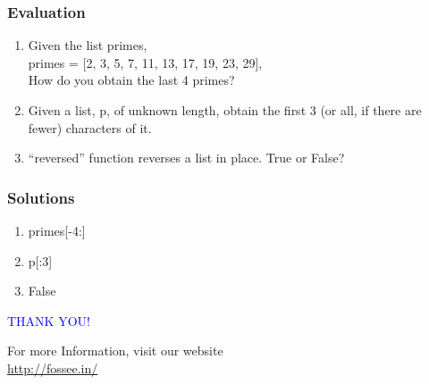 \documentclass[presentation]{beamer}
\begin{document}
\begin{frame}
\frametitle{Evaluation}
\label{sec-10}


\begin{enumerate}
\item Given the list primes,\\ primes = [2, 3, 5, 7, 11, 13, 17, 19, 23,
   29],\\ How do you obtain the last 4 primes?
\vspace{11pt}   
\item Given a list, p, of unknown length, obtain the first 3 (or all, if
   there are fewer) characters of it.
\vspace{11pt}   
\item ``reversed'' function reverses a list in place. True or False?
\end{enumerate}
\end{frame}
\begin{frame}
\frametitle{Solutions}
\label{sec-11}


\begin{enumerate}
\item primes[-4:]
\vspace{8pt}
\item p[:3]
\vspace{8pt}
\item False
\end{enumerate}
\end{frame}
\begin{frame}

  \begin{block}{}
  \begin{center}
  \textcolor{blue}{\Large THANK YOU!} 
  \end{center}
  \end{block}
\begin{block}{}
  \begin{center}
    For more Information, visit our website\\
    \url{http://fossee.in/}
  \end{center}  
  \end{block}
\end{frame}
\end{document}
